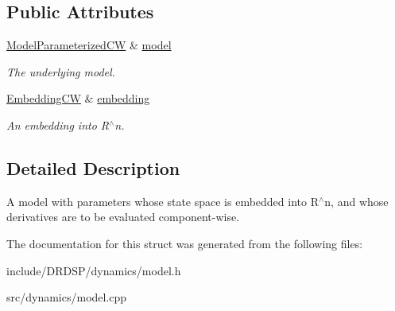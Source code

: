 \subsection*{Public Attributes}
\begin{DoxyCompactItemize}
\item 
\hypertarget{struct_d_r_d_s_p_1_1_model_parameterized_embedded_c_w_a33c7f535c705ffc2d8fd30842757b093}{\hyperlink{struct_d_r_d_s_p_1_1_model_parameterized_c_w}{Model\-Parameterized\-C\-W} \& \hyperlink{struct_d_r_d_s_p_1_1_model_parameterized_embedded_c_w_a33c7f535c705ffc2d8fd30842757b093}{model}}\label{struct_d_r_d_s_p_1_1_model_parameterized_embedded_c_w_a33c7f535c705ffc2d8fd30842757b093}

\begin{DoxyCompactList}\small\item\em The underlying model. \end{DoxyCompactList}\item 
\hypertarget{struct_d_r_d_s_p_1_1_model_parameterized_embedded_c_w_a38c7555dcaadd84066f2746b035d35c4}{\hyperlink{struct_d_r_d_s_p_1_1_embedding_c_w}{Embedding\-C\-W} \& \hyperlink{struct_d_r_d_s_p_1_1_model_parameterized_embedded_c_w_a38c7555dcaadd84066f2746b035d35c4}{embedding}}\label{struct_d_r_d_s_p_1_1_model_parameterized_embedded_c_w_a38c7555dcaadd84066f2746b035d35c4}

\begin{DoxyCompactList}\small\item\em An embedding into R$^\wedge$n. \end{DoxyCompactList}\end{DoxyCompactItemize}


\subsection{Detailed Description}
A model with parameters whose state space is embedded into R$^\wedge$n, and whose derivatives are to be evaluated component-\/wise. 

The documentation for this struct was generated from the following files\-:\begin{DoxyCompactItemize}
\item 
include/\-D\-R\-D\-S\-P/dynamics/model.\-h\item 
src/dynamics/model.\-cpp\end{DoxyCompactItemize}
